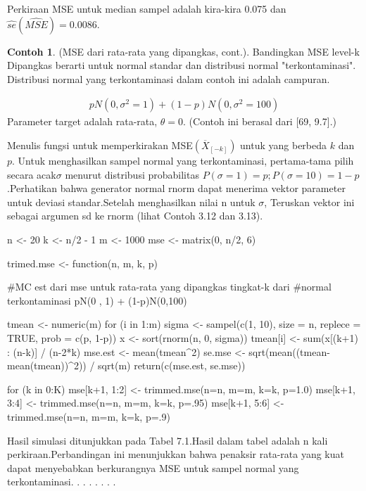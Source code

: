 \documentclass[a4paper,12pt]{article}
\theoremstyle{definition}
\newtheorem{example}{Contoh}[section]
\begin{document}
Perkiraan MSE untuk median sampel adalah kira-kira 0.075 dan $\widehat{se}(\widehat{MSE})=0.0086.$
\begin{example}
    (MSE dari rata-rata yang dipangkas, cont.). Bandingkan MSE level-k Dipangkas berarti untuk normal standar dan distribusi normal "terkontaminasi". Distribusi normal yang terkontaminasi dalam contoh ini adalah campuran.
\end{example}
\begin{align}
    pN(0,\sigma^{2}=1)+(1-p)N(0,\sigma ^{2}=100)
\end{align}
Parameter target adalah rata-rata, $\theta=0$. (Contoh ini berasal dari [69, 9.7].)

Menulis fungsi untuk memperkirakan MSE$(\overline{X}_{\left [ -k \right ]})$  untuk yang berbeda $k$ dan $p$. Untuk menghasilkan sampel normal yang terkontaminasi, pertama-tama pilih secara acak$\sigma$ menurut distribusi probabilitas $P(\sigma=1)=p;P(\sigma=10)=1-p$.Perhatikan bahwa generator normal rnorm dapat menerima vektor parameter untuk deviasi standar.Setelah menghasilkan nilai n untuk $\sigma$, Teruskan vektor ini sebagai argumen sd ke rnorm (lihat Contoh 3.12 dan 3.13).

\begin{spverbatim}
    n <- 20
    k <- n/2 - 1
    m <- 1000
    mse <- matrix(0, n/2, 6)

    trimed.mse <- function(n, m, k, p) {
         #MC est dari mse untuk rata-rata yang dipangkas tingkat-k dari
         #normal terkontaminasi pN(0 , 1) + (1-p)N(0,100)

         tmean <- numeric(m)
         for (i in 1:m){
            sigma <- sampel(c(1, 10), size = n,
                 replece = TRUE, prob = c(p, 1-p))
            x <- sort(rnorm(n, 0, sigma))
            tmean[i] <- sum(x[(k+1) : (n-k)] / (n-2*k)
         }
         mse.est <- mean(tmean^2)
         se.mse <- sqrt(mean((tmean-mean(tmean))^2)) / sqrt(m)
         return(c(mse.est, se.mse))
    }
    for (k in 0:K) {
        mse[k+1, 1:2] <- trimmed.mse(n=n, m=m, k=k, p=1.0)
        mse[k+1, 3:4] <- trimmed.mse(n=n, m=m, k=k, p=.95)
        mse[k+1, 5:6] <- trimmed.mse(n=n, m=m, k=k, p=.9)
    }
\end{spverbatim}

Hasil simulasi ditunjukkan pada Tabel 7.1.Hasil dalam tabel adalah n kali perkiraan.Perbandingan ini menunjukkan bahwa penaksir rata-rata yang kuat dapat menyebabkan berkurangnya MSE untuk sampel normal yang terkontaminasi. 
.
.
.
.
.
.
.
\end{document}
